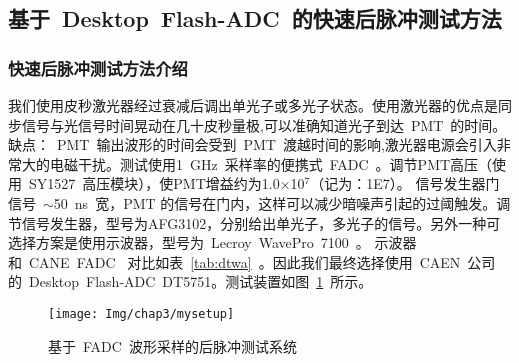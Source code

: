 \subsection{基于~Desktop~Flash-ADC~的快速后脉冲测试方法}
\subsubsection{快速后脉冲测试方法介绍}
我们使用皮秒激光器经过衰减后调出单光子或多光子状态。使用激光器的优点是同步信号与光信号时间晃动在几十皮秒量极,可以准确知道光子到达~PMT~的时间。缺点：~PMT~输出波形的时间会受到~PMT~渡越时间的影响,激光器电源会引入非常大的电磁干扰。测试使用1~GHz~采样率的便携式~FADC~。调节PMT高压（使用~SY1527~高压模块），使PMT增益约为1.0$\times$10$^7$（记为：1E7）。 信号发生器门信号~$\sim$50~ns~宽，PMT 的信号在门内，这样可以减少暗噪声引起的过阈触发。调节信号发生器，型号为AFG3102，分别给出单光子，多光子的信号。另外一种可选择方案是使用示波器，型号为~Lecroy~WavePro~7100~。 示波器和~CANE~FADC~ 对比如表~\ref{tab:dtwa}~。因此我们最终选择使用~CAEN~公司的~Desktop~Flash-ADC~DT5751。测试装置如图~\ref{fig:km3}~所示。
\begin{figure}[!htb]
  \centering
   \texttt{[image: Img/chap3/mysetup]}
    \caption{基于~FADC~波形采样的后脉冲测试系统}
  \label{fig:km3}
\end{figure}


